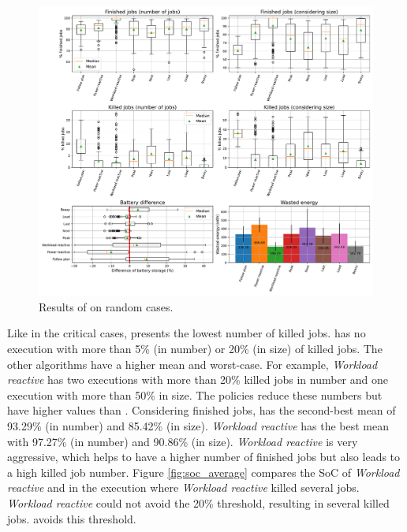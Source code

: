 \begin{figure}[!htb]
    \centering
    \includegraphics[scale=0.39]{Images/Heuristic/100_cases.pdf}
    \caption{Results of \emph{\systemName} on random cases.}
    \label{fig:beasy_average}
\end{figure}

Like in the critical cases, \emph{\systemName} presents the lowest number of killed jobs. \emph{\systemName} has no execution with more than 5\% (in number) or 20\% (in size) of killed jobs. The other algorithms have a higher mean and worst-case. For example, \emph{Workload reactive} has two executions with more than 20\% killed jobs in number and one execution with more than 50\% in size. The policies reduce these numbers but have higher values than \emph{\systemName}. Considering finished jobs, \emph{\systemName} has the second-best mean of 93.29\% (in number) and 85.42\% (in size). \emph{Workload reactive} has the best mean with 97.27\% (in number) and 90.86\% (in size). \emph{Workload reactive} is very aggressive, which helps to have a higher number of finished jobs but also leads to a high killed job number. Figure \ref{fig:soc_average} compares the SoC of \emph{Workload reactive} and \emph{\systemName} in the execution where \emph{Workload reactive} killed several jobs. \emph{Workload reactive} could not avoid the 20\% threshold, resulting in several killed jobs. \emph{\systemName} avoids this threshold.

